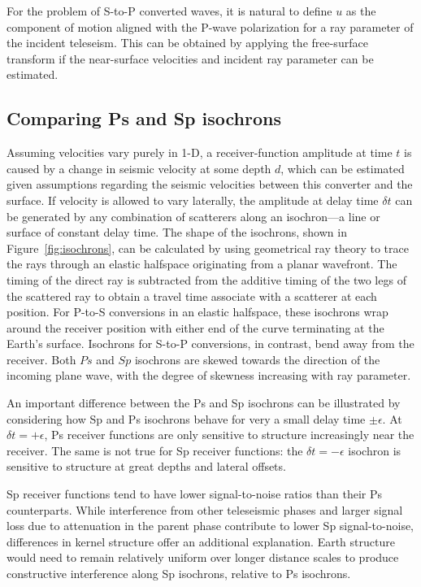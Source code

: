 \documentclass[referee]{gji}
\begin{document}
For the problem of S-to-P converted waves, it is natural to define $u$ as the component of motion aligned with the P-wave polarization for a ray parameter of the incident teleseism.  This can be obtained by applying the free-surface transform \citep{Kennett1991a} if the near-surface velocities and incident ray parameter can be estimated.

\subsection{Comparing Ps and Sp isochrons}

Assuming velocities vary purely in 1-D, a receiver-function amplitude at time $t$ is caused by a change in seismic velocity at some depth $d$, which can be estimated given assumptions regarding the seismic velocities between this converter and the surface. If velocity is allowed to vary laterally, the amplitude at delay time $\delta t$ can be generated by any combination of scatterers along an isochron---a line or surface of constant delay time. The shape of the isochrons, shown in Figure~\ref{fig:isochrons}, can be calculated by using geometrical ray theory to trace the rays through an elastic halfspace originating from a planar wavefront.  The timing of the direct ray is subtracted from the additive timing of the two legs of the scattered ray to obtain a travel time associate with a scatterer at each position.  For P-to-S conversions in an elastic halfspace, these isochrons wrap around the receiver position with either end of the curve terminating at the Earth's surface.  Isochrons for S-to-P conversions, in contrast, bend away from the receiver.  Both $Ps$ and $Sp$ isochrons are skewed towards the direction of the incoming plane wave, with the degree of skewness increasing with ray parameter.

An important difference between the Ps and Sp isochrons can be illustrated by considering how Sp and Ps isochrons behave for very a small delay time $\pm \epsilon$.
At $\delta t=+\epsilon$, Ps receiver functions are only sensitive to structure increasingly near the receiver.  The same is not true for Sp receiver functions: the $\delta t=-\epsilon$ isochron is sensitive to structure at great depths and lateral offsets.

Sp receiver functions tend to have lower signal-to-noise ratios than their Ps counterparts.  While interference from other teleseismic phases and larger signal loss due to attenuation in the parent phase contribute to lower Sp signal-to-noise, differences in kernel structure offer an additional explanation.  Earth structure would need to remain relatively uniform over longer distance scales to produce constructive interference along Sp isochrons, relative to Ps isochrons.
\end{document}
